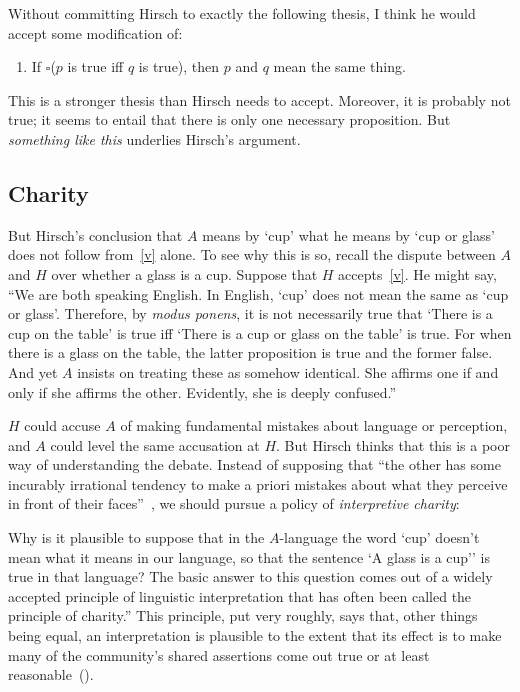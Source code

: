\documentclass[11pt]{article}
\newenvironment{squote}{%
\begin{spacing}{1}
       	\begin{list}{}{%
\setlength{\labelwidth}{0pt}%
\rightmargin\leftmargin%
}
\item\relax
}{%
\end{list}%
\end{spacing}
}
\begin{document}
\begin{spacing}{1.25}
Without committing Hirsch to exactly the following thesis, I think he
would accept some modification of:
\begin{enumerate}[itemindent=25pt, label=(V)]
    \item If $\square$($p$ is true iff $q$ is true), then $p$ and $q$ mean
    the same thing. \label{v}
\end{enumerate}

This is a stronger thesis than Hirsch needs to accept.  Moreover, it
is probably not true; it seems to entail that there is only one
necessary proposition.  But {\em something like this} underlies
Hirsch's argument.

\subsection{Charity}
\label{charity}
But Hirsch's conclusion that $A$ means by `cup' what he means by `cup
or glass' does not follow from~\ref{v} alone.  To see why this is so,
recall the dispute between $A$ and $H$ over whether a glass is a cup.
Suppose that $H$ accepts~\ref{v}.  He might say, ``We are both
speaking English.  In English, `cup' does not mean the same as `cup or
glass'. Therefore, by {\em modus ponens}, it is not necessarily true
that `There is a cup on the table' is true iff `There is a cup or
glass on the table' is true.  For when there is a glass on the table,
the latter proposition is true and the former false.  And yet $A$
insists on treating these as somehow identical.  She affirms one if
and only if she affirms the other.  Evidently, she is deeply
confused.''

$H$ could accuse $A$ of making fundamental mistakes about language or
perception, and $A$ could level the same accusation at $H$.  But
Hirsch thinks that this is a poor way of understanding the
debate.  Instead of supposing that ``the other has some incurably
irrational tendency to make a priori mistakes about what they perceive
in front of their faces''~\citep[78]{hirsch2005}, we should pursue a
policy of {\em interpretive charity}:

\begin{squote}
Why is it plausible to suppose that in the $A$-language the word
`cup' doesn't mean what it means in our language, so that the sentence
`A glass is a cup'' is true in that language?  The basic answer to
this question comes out of a widely accepted principle of linguistic
interpretation that has often been called the principle of charity.''
This principle, put very roughly, says that, other things being equal,
an interpretation is plausible to the extent that its effect is to
make many of the community's shared assertions come out true or at
least reasonable~(\citeyear[71]{hirsch2005}).
\end{squote}


\end{spacing}
\end{document}
